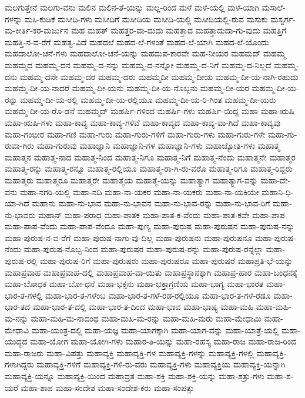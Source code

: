 {ಮಲಗುತ್ತೇನೆ
ಮಲಗು-ವನು
ಮಲಿನ
ಮಲಿನ-ತೆ-ಯನ್ನು
ಮಲ್ಲ-ರಿಂದ
ಮಳೆ
ಮಳೆ-ಯಲ್ಲಿ
ಮಳೆ-ಯಾಗಿ
ಮಸಾಲೆ-ಗಳನ್ನು
ಮಸಿ-ಕುಡಿಕೆ
ಮಸೀದಿ-ಗಳು
ಮಸೀದಿಗೆ
ಮಸೀದಿಯ
ಮಸೀದಿ-ಯಲ್ಲಿ
ಮಸೀದಿಯಲ್ಲಿ-ರುವ
ಮಸುಕು
ಮಸ್ವರ್ಗ-ಮ-ಕೀರ್ತಿ-ಕರ-ಮರ್ಜುನ
ಮಹ
ಮಹತ್
ಮಹತ್ತರ-ವಾ-ದುದು
ಮಹತ್ತಾದ
ಮಹತ್ತಾದುದಾ-ಗು-ವುದು
ಮಹತ್ತಿಗೆ
ಮಹತ್ತಿ-ನ-ವ-ರೆಗೆ
ಮಹತ್ವ-ವಿದೆ
ಮಹದಲೆ
ಮಹದ-ಲೆ-ಗಳಂತೆ
ಮಹದ-ಲೆ-ಯಾಗಿ
ಮಹದ-ಲೆ-ಯೊಂದು
ಮಹದಾಲೋ-ಚನೆ-ಗಳು
ಮಹದಾಲೋ-ಚನೆ-ಯನ್ನು
ಮಹದುಪ-ಕಾರವೇ
ಮಹ-ನೀಯರ
ಮಹಮದ್
ಮಹಮ್ಮ
ಮಹಮ್ಮದ
ಮಹಮ್ಮ-ದನ
ಮಹಮ್ಮ-ದ-ನನ್ನು
ಮಹಮ್ಮ-ದ-ನನ್ನೋ
ಮಹಮ್ಮ-ದ-ನಿಗೆ
ಮಹಮ್ಮ-ದ-ನಿಲ್ಲದೆ
ಮಹಮ್ಮ-ದನು
ಮಹಮ್ಮ-ದನೇ
ಮಹಮ್ಮ-ದರ
ಮಹಮ್ಮ-ದರು
ಮಹಮ್ಮದೀ
ಮಹಮ್ಮ-ದೀಯ
ಮಹಮ್ಮ-ದೀ-ಯ-ನಾಗಿ-ರಹುದು
ಮಹಮ್ಮ-ದೀ-ಯ-ನಾದರೆ
ಮಹಮ್ಮ-ದೀ-ಯನು
ಮಹಮ್ಮ-ದೀ-ಯ-ನೊಬ್ಬನು
ಮಹಮ್ಮ-ದೀ-ಯರ
ಮಹಮ್ಮ-ದೀ-ಯ-ರನ್ನು
ಮಹಮ್ಮ-ದೀ-ಯ-ರಲ್ಲಿ
ಮಹಮ್ಮ-ದೀ-ಯ-ರಲ್ಲಿಯೂ
ಮಹಮ್ಮ-ದೀ-ಯ-ರಿ-ಗಿಂತ
ಮಹಮ್ಮ-ದೀ-ಯರು
ಮಹಮ್ಮ-ದೀ-ಯ-ರೊ-ಡನೆ
ಮಹಮ್ಮದ್
ಮಹರ್ಷಿ-ಗಳಿಂದ
ಮಹರ್ಷಿ-ಗಳು
ಮಹರ್ಷಿ-ಯಿದ್ದ
ಮಹಾ
ಮಹಾ-ಋಷಿ
ಮಹಾ-ಋಷಿ-ಗಳು
ಮಹಾ-ಕಾವ್ಯ
ಮಹಾ-ಕಾವ್ಯ-ಗಳಿವೆ
ಮಹಾ-ಕಾವ್ಯದ
ಮಹಾ-ಕಾವ್ಯ-ವಾ-ಗಿದೆ
ಮಹಾ-ಕಾವ್ಯವು
ಮಹಾ-ಗಂಭೀರ
ಮಹಾ-ಗಣಿ
ಮಹಾ-ಗುರು
ಮಹಾ-ಗುರು-ಗಳಿಗೆ
ಮಹಾ-ಗುರು-ಗಳು
ಮಹಾ-ಗುರು-ಗಳೇ
ಮಹಾ-ಗು-ರುವಾ-ಗಿರು
ಮಹಾ-ಗುರುವು
ಮಹಾಜ್ಞಾನಿ
ಮಹಾಜ್ಞಾನಿ-ಗಳ
ಮಹಾಜ್ಞಾನಿ-ಗಳು
ಮಹಾಜ್ಯೋತಿ-ಗಳು
ಮಹಾತ್ಮ
ಮಹಾತ್ಮನ
ಮಹಾತ್ಮ-ನಾದ
ಮಹಾತ್ಮ-ನಿಂದ
ಮಹಾತ್ಮ-ನಿಗೂ
ಮಹಾತ್ಮ-ನಿಗೆ
ಮಹಾತ್ಮ-ನೆಂದು
ಮಹಾತ್ಮನೇ
ಮಹಾತ್ಮರ
ಮಹಾತ್ಮ-ರನ್ನು
ಮಹಾತ್ಮ-ರನ್ನೂ
ಮಹಾತ್ಮ-ರಲ್ಲಿಯೂ
ಮಹಾತ್ಮ-ರಾ-ಗಿ-ರು-ವರೊ
ಮಹಾತ್ಮ-ರಿಗೂ
ಮಹಾತ್ಮ-ರಿದ್ದರು
ಮಹಾತ್ಮರು
ಮಹಾತ್ಮರೂ
ಮಹಾತ್ಮರೇ
ಮಹಾತ್ಮೆಯ
ಮಹಾತ್ಮೆ-ಯನ್ನು
ಮಹಾತ್ಯಾಗ
ಮಹಾತ್ಯಾಗ-ವನ್ನು
ಮಹಾ-ದೇ-ವನು
ಮಹಾ-ನಗರಿ-ಯಲ್ಲಿ
ಮಹಾ-ನದಿ
ಮಹಾ-ನಾ-ಯಕರ
ಮಹಾ-ನಾ-ಯಕರು
ಮಹಾ-ನಾ-ಯಕಿಯೇ
ಮಹಾನಿ-ಧಿ-ಯಾ-ಗಿದೆ
ಮಹಾನು
ಮಹಾ-ನು-ಭಾವ
ಮಹಾ-ನು-ಭಾವನ
ಮಹಾ-ನು-ಭಾವ-ರನ್ನು
ಮಹಾ-ನು-ಭಾವ-ರಿಗೆ
ಮಹಾ-ನು-ಭಾವರು
ಮಹಾನ್
ಮಹಾ-ಪರಾಧ
ಮಹಾ-ಪಾತಕ
ಮಹಾ-ಪಾತ-ಕ-ವೆಂದು
ಮಹಾ-ಪಾತ-ಕವೇ
ಮಹಾ-ಪಾಪ
ಮಹಾ-ಪಾಪ-ವೆಂದು
ಮಹಾ-ಪಾಪ-ವೆಂದೂ
ಮಹಾ-ಪುಣ್ಯ
ಮಹಾ-ಪುರುಷ
ಮಹಾ-ಪುರುಷನ
ಮಹಾ-ಪುರುಷ-ನನ್ನು
ಮಹಾ-ಪುರುಷ-ನ-ವ-ರೆಗೆ
ಮಹಾ-ಪುರುಷ-ನಾಗು-ವು-ದಿಲ್ಲ
ಮಹಾ-ಪುರುಷನು
ಮಹಾ-ಪುರುಷನೂ
ಮಹಾ-ಪುರುಷ-ನೆಂದು
ಮಹಾ-ಪುರುಷ-ನೊಬ್ಬ-ನಿಂದ
ಮಹಾ-ಪುರುಷರ
ಮಹಾ-ಪುರುಷ-ರನ್ನು
ಮಹಾ-ಪುರುಷ-ರನ್ನೆಲ್ಲಾ
ಮಹಾ-ಪುರುಷ-ರಲ್ಲಿ
ಮಹಾ-ಪುರುಷ-ರಿಗೆ
ಮಹಾ-ಪುರುಷರು
ಮಹಾ-ಪುರುಷರೂ
ಮಹಾ-ಪುರುಷರೆ
ಮಹಾಪ್ರತಿ-ಭೆ-ಯನ್ನು
ಮಹಾಪ್ರವಾಹ
ಮಹಾಪ್ರವಾಹ-ದಲ್ಲಿ
ಮಹಾಪ್ರವಾಹ-ವಾ-ಯಿತು
ಮಹಾಪ್ರಸ್ಥಾನಕ್ಕಾಗಿ
ಮಹಾಪ್ರ-ಹಾರ
ಮಹಾ-ಬಂಧನಕ್ಕೆ
ಮಹಾ-ಬೋಧಕ
ಮಹಾ-ಬೋ-ಧನೆ
ಮಹಾ-ಭಕ್ತನು
ಮಹಾ-ಭಕ್ತಾಗ್ರಣಿಯ
ಮಹಾ-ಭಾಗ್ಯ
ಮಹಾ-ಭಾರತ
ಮಹಾ-ಭಾರ-ತ-ಗಳಲ್ಲಿ
ಮಹಾ-ಭಾರ-ತ-ಗಳೆಂಬ
ಮಹಾ-ಭಾರ-ತ-ಗಳೆ-ರಡ-ರಲ್ಲಿಯೂ
ಮಹಾ-ಭಾರ-ತ-ಗಳೆ-ರಡೂ
ಮಹಾ-ಭಾರ-ತದ
ಮಹಾ-ಭಾರ-ತ-ದಲ್ಲಿ
ಮಹಾ-ಭಾರ-ತ-ದಿಂದ
ಮಹಾ-ಭಾವ
ಮಹಾ-ಭಾಷ್ಯ
ಮಹಾ-ಮಹಿ
ಮಹಾ-ಮಹಿ-ಮ-ನನ್ನು
ಮಹಾ-ಮಹಿ-ಮ-ನಾದಂಥ
ಮಹಾ-ಮಹಿ-ಮ-ರನ್ನು
ಮಹಾ-ಮಹಿ-ಮರು
ಮಹಾ-ಮೇಧಾಮಿ
ಮಹಾ-ಮೇಧಾವಿ
ಮಹಾ-ಯಂತ್ರ-ದಲ್ಲಿ
ಮಹಾ-ಯಜ್ಞ
ಮಹಾ-ಯಾಗಕ್ಕಾಗಿ
ಮಹಾ-ಯಾಗ-ವನ್ನು
ಮಹಾ-ಯಾತ್ರೆ-ಯಲ್ಲಿ
ಮಹಾ-ಯುದ್ಧದ
ಮಹಾ-ಯೋಗ
ಮಹಾ-ಯೋಗಿ-ಗಳು
ಮಹಾರ-ತಿ-ಯನ್ನು
ಮಹಾ-ರಹಸ್ಯ
ಮಹಾ-ರಾಜ
ಮಹಾ-ರಾಜ-ರಿಂದ
ಮಹಾ-ರಾಜರು
ಮಹಾ-ವಿಪತ್ತು
ಮಹಾವ್ಯಕ್ತಿ
ಮಹಾವ್ಯಕ್ತಿ-ಗಳ
ಮಹಾವ್ಯಕ್ತಿ-ಗಳನ್ನು
ಮಹಾವ್ಯಕ್ತಿ-ಗಳಲ್ಲಿ
ಮಹಾವ್ಯಕ್ತಿ-ಗಳಾಗಿದ್ದರು
ಮಹಾವ್ಯಕ್ತಿ-ಗಳಿಗೆ
ಮಹಾವ್ಯಕ್ತಿ-ಗಳಿ-ರು-ವರು
ಮಹಾವ್ಯಕ್ತಿ-ಗಳು
ಮಹಾವ್ಯಕ್ತಿಯ
ಮಹಾವ್ಯಕ್ತಿ-ಯನ್ನಾಗಿ
ಮಹಾವ್ಯಕ್ತಿ-ಯನ್ನೂ
ಮಹಾವ್ಯಕ್ತಿ-ಯಿಂದ
ಮಹಾವ್ರತ
ಮಹಾ-ಶಕ್ತಿ
ಮಹಾ-ಶಕ್ತಿ-ಯನ್ನು
ಮಹಾ-ಶತ್ರು-ಗಳು
ಮಹಾ-ಶ-ಯರೆ
ಮಹಾ-ಶಾಪ
ಮಹಾ-ಸಂದೇಶ
ಮಹಾ-ಸಂದೇಶ-ಕರು
ಮಹಾ-ಸಂಪತ್ತು
}
